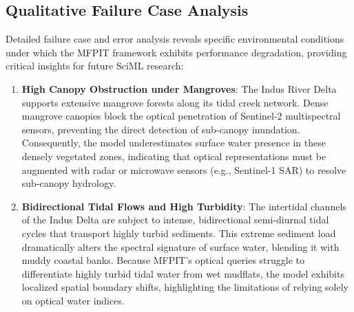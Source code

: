 \documentclass[preprint,12pt]{elsarticle}
\begin{document}
\subsection{Qualitative Failure Case Analysis}
Detailed failure case and error analysis reveals specific environmental conditions under which the MFPIT framework exhibits performance degradation, providing critical insights for future SciML research:
\begin{enumerate}
    \item \textbf{High Canopy Obstruction under Mangroves}: The Indus River Delta supports extensive mangrove forests along its tidal creek network. Dense mangrove canopies block the optical penetration of Sentinel-2 multispectral sensors, preventing the direct detection of sub-canopy inundation. Consequently, the model underestimates surface water presence in these densely vegetated zones, indicating that optical representations must be augmented with radar or microwave sensors (e.g., Sentinel-1 SAR) to resolve sub-canopy hydrology.
    \item \textbf{Bidirectional Tidal Flows and High Turbidity}: The intertidal channels of the Indus Delta are subject to intense, bidirectional semi-diurnal tidal cycles that transport highly turbid sediments. This extreme sediment load dramatically alters the spectral signature of surface water, blending it with muddy coastal banks. Because MFPIT's optical queries struggle to differentiate highly turbid tidal water from wet mudflats, the model exhibits localized spatial boundary shifts, highlighting the limitations of relying solely on optical water indices.
\end{enumerate}
\end{document}

